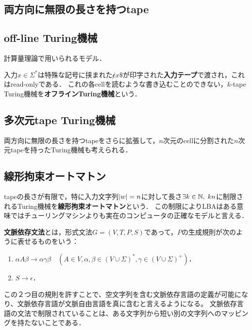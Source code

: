 \documentclass[uplatex, dvipdfmx]{jsreport}
\begin{document}
\subsection{両方向に無限の長さを持つtape}

\subsection{off-line Turing機械}

計算量理論で用いられるモデル．

\begin{definition}
    入力$x\in\Sigma^*$は特殊な記号に挟まれた$\not cx\$$が印字された\textbf{入力テープ}で渡され，これはread-onlyである．
    これの各cellを読むような書き込むことのできない，$k$-tape Turing機械を\textbf{オフラインTuring機械}という．
\end{definition}

\subsection{多次元tape Turing機械}

両方向に無限の長さを持つtapeをさらに拡張して，$n$次元のcellに分割された$n$次元tapeを持ったTuring機械も考えられる．

\subsection{線形拘束オートマトン}

\begin{definition}
    tapeの長さが有限で，特に入力文字列$\lvert w\rvert=n$に対して長さ$\exists k\in\mathbb{N},\;kn$に制限されるTuring機械を\textbf{線形拘束オートマトン}という．
    この制限によりLBAはある意味ではチューリングマシンよりも実在のコンピュータの正確なモデルと言える．
\end{definition}

\begin{definition}
    \textbf{文脈依存文法}とは，形式文法$G=(V,T,P,S)$であって，$P$の生成規則が次のように表せるものをいう：
    \begin{enumerate}
        \item $\alpha A\beta\to\alpha\gamma\beta\quad(A\in V,\alpha,\beta\in(V\cup\Sigma)^*,\gamma\in(V\cup\Sigma)^+)$．
        \item $S\to\epsilon$．
    \end{enumerate}
\end{definition}
\begin{remark}
    この２つ目の規則を許すことで、空文字列を含む文脈依存言語の定義が可能になり、文脈依存言語が文脈自由言語を真に含むと言えるようになる。
    文脈依存言語の文法で制限されていることは、ある文字列から短い別の文字列へのマッピングを持たないことである．
\end{remark}
\end{document}
